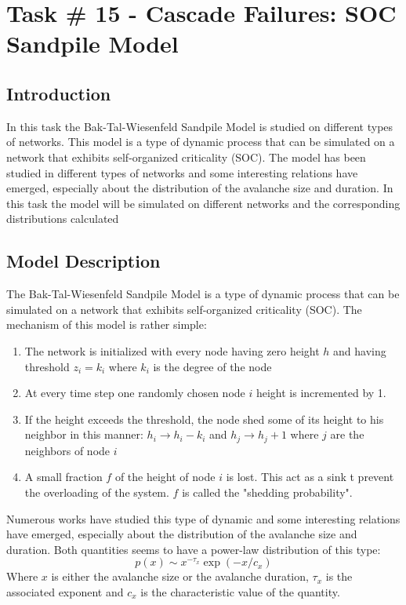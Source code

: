 \chapter{Task \# 15 - Cascade Failures: SOC Sandpile Model}

\section{Introduction}
In this task the Bak-Tal-Wiesenfeld Sandpile Model\cite{SandpileModel} is studied on different types of networks. This model is a type of dynamic process that can be simulated on a network that exhibits self-organized criticality (SOC). The model has been studied in different types of networks and some interesting relations have emerged, especially about the distribution of the avalanche size and duration. In this task the model will be simulated on different networks and the corresponding distributions calculated

\section{Model Description}

The Bak-Tal-Wiesenfeld Sandpile Model\cite{SandpileModel} is a type of dynamic process that can be simulated on a network that exhibits self-organized criticality (SOC).
The mechanism of this model is rather simple:
\begin{enumerate}
    \item The network is initialized with every node having zero height $h$ and having threshold $z_i = k_i$ where $k_i$ is the degree of the node
    \item At every time step one randomly chosen node $i$ height is incremented by 1.
    \item If the height exceeds the threshold, the node shed some of its height to his neighbor in this manner: $h_i \rightarrow h_i - k_i$ and $h_j \rightarrow h_j + 1$ where $j$ are the neighbors of node $i$
    \item A small fraction $f$ of the height of node $i$ is lost. This act as a sink t prevent the overloading of the system. $f$ is called the "shedding probability".
\end{enumerate}

Numerous works have studied this type of dynamic and some interesting relations have emerged, especially about the distribution of the avalanche size and duration.
Both quantities seems to have a power-law distribution of this type:
$$p(x) \sim x^{-\tau_x}\exp{(-x/c_x)}$$
Where $x$ is either the avalanche size or the avalanche duration, $\tau_x$ is the associated exponent and $c_x$ is the characteristic value of the quantity. \cite{scale_free_sandpile}

